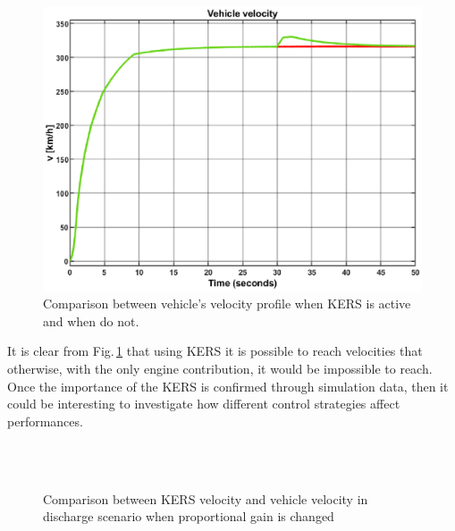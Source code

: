 \documentclass[11pt]{article}
\begin{document}
\begin{figure}[H]
	\centering
	\includegraphics[width=.6\textwidth]{Images/Results_Dynamics/Discharge_comparison/acceleration_kers_vs_nokers.eps}
	\caption{Comparison between vehicle's velocity profile when KERS is active and when do not.}
	\label{fig: k vs nok}
\end{figure}

It is clear from Fig.\,\ref{fig: k vs nok} that using KERS it is possible to reach velocities that otherwise, with the only engine contribution, it would be impossible to reach. Once the importance of the KERS is confirmed through simulation data, then it could be interesting to investigate how different control strategies affect performances.

\begin{figure}[H]
	\centering
	 \\
	 \\
	\caption{Comparison between KERS velocity \protect{} and vehicle velocity in discharge scenario when proportional gain is changed \protect{}}
	\label{fig: kers vel plus vehicle vel comp}
\end{figure}
\end{document}
